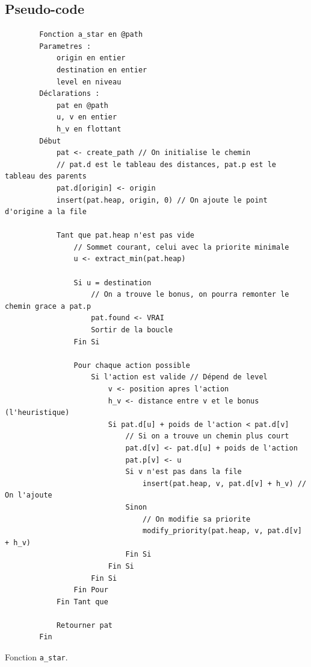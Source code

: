 \newpage

\subsection{Pseudo-code}

\begin{longlisting}
    \begin{verbatim}
        Fonction a_star en @path
        Parametres :
            origin en entier
            destination en entier
            level en niveau
        Déclarations :
            pat en @path
            u, v en entier
            h_v en flottant
        Début
            pat <- create_path // On initialise le chemin
            // pat.d est le tableau des distances, pat.p est le tableau des parents
            pat.d[origin] <- origin
            insert(pat.heap, origin, 0) // On ajoute le point d'origine a la file

            Tant que pat.heap n'est pas vide
                // Sommet courant, celui avec la priorite minimale
                u <- extract_min(pat.heap)

                Si u = destination
                    // On a trouve le bonus, on pourra remonter le chemin grace a pat.p
                    pat.found <- VRAI
                    Sortir de la boucle
                Fin Si

                Pour chaque action possible
                    Si l'action est valide // Dépend de level
                        v <- position apres l'action
                        h_v <- distance entre v et le bonus (l'heuristique)
                        Si pat.d[u] + poids de l'action < pat.d[v]
                            // Si on a trouve un chemin plus court
                            pat.d[v] <- pat.d[u] + poids de l'action
                            pat.p[v] <- u
                            Si v n'est pas dans la file
                                insert(pat.heap, v, pat.d[v] + h_v) // On l'ajoute
                            Sinon
                                // On modifie sa priorite
                                modify_priority(pat.heap, v, pat.d[v] + h_v)
                            Fin Si
                        Fin Si
                    Fin Si
                Fin Pour
            Fin Tant que

            Retourner pat
        Fin
    \end{verbatim}
    \caption{Fonction \texttt{a\_star}.}
    \label{listing:c-a_star}
\end{longlisting}

